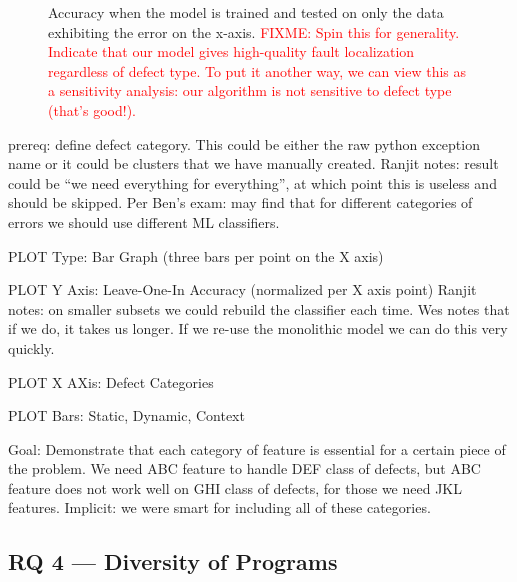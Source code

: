\documentclass[conference]{IEEEtran}
\newcommand{\fixme}[1]{\textcolor{red}{FIXME: #1}}
\begin{document}
\begin{figure}
\caption{Accuracy when the model is trained and tested on only the data exhibiting
the error on the x-axis.
\fixme{Spin this for generality. Indicate that our model gives high-quality
fault localization regardless of defect type. To put it another way, we
can view this as a sensitivity analysis: our algorithm is not sensitive to
defect type (that's good!).}
}
\label{fig:defect-categories}
\end{figure}

prereq: define defect category. This could be either the raw python
exception name or it could be clusters that we have manually created.
Ranjit notes: result could be ``we need everything for everything'', at
which point this is useless and should be skipped. Per Ben's exam: may find
that for different categories of errors we should use different ML
classifiers.

PLOT Type: Bar Graph (three bars per point on the X axis)

PLOT Y Axis: Leave-One-In Accuracy (normalized per X axis point)
Ranjit notes: on smaller subsets we could rebuild the classifier each time.
Wes notes that if we do, it takes us longer. If we re-use the monolithic
model we can do this very quickly.

PLOT X AXis: Defect Categories

PLOT Bars: Static, Dynamic, Context

Goal: Demonstrate that each category of feature is essential for a certain
piece of the problem. We need ABC feature to handle DEF class of defects,
but ABC feature does not work well on GHI class of defects, for those we
need JKL features. Implicit: we were smart for including all of these
categories.

\subsection{RQ 4 --- Diversity of Programs}

\end{document}
